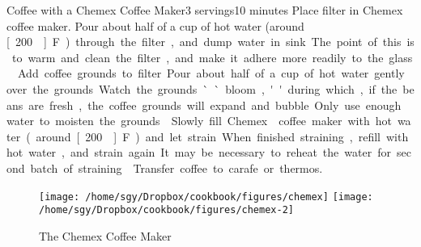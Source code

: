 \begin{recipe}{Coffee with a Chemex\textsuperscript{\texttrademark} Coffee Maker}{3 servings}{10 minutes}
Place filter in Chemex\textsuperscript{\texttrademark} coffee maker.  Pour about half of a cup of hot water (around \unit[200\0]{F}) through the filter, and dump water in sink.  The point of this is to warm and clean the filter, and make it adhere more readily to the glass.
Add coffee grounds to filter.  Pour about half of a cup of hot water gently over the grounds.  Watch the grounds ``bloom,'' during which, if the beans are fresh, the coffee grounds will expand and bubble.  Only use enough water to moisten the grounds.
\newstep
Slowly fill Chemex\textsuperscript{\texttrademark} coffee maker with hot water (around \unit[200\0]{F}) and let strain.  When finished straining, refill with hot water, and strain again.  It may be necessary to reheat the water for second batch of straining.
\newstep
Transfer coffee to carafe or thermos.
\end{recipe}
\begin{figure}[b!]
\begin{center}
\texttt{[image: /home/sgy/Dropbox/cookbook/figures/chemex]}
\hspace{0.1\textwidth}
\texttt{[image: /home/sgy/Dropbox/cookbook/figures/chemex-2]}
\end{center}
\caption*{The Chemex\tm{} Coffee Maker}
\end{figure}
\clearpage
